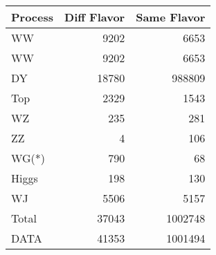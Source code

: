 \begin{table}[ht]
	\centering
\begin{tabular}{lrr}

Process &  Diff Flavor &  Same Flavor \\
		\hline
     WW &         9202 &         6653 \\
     WW &         9202 &         6653 \\
     DY &        18780 &       988809 \\
    Top &         2329 &         1543 \\
     WZ &          235 &          281 \\
     ZZ &            4 &          106 \\
  WG(*) &          790 &           68 \\
  Higgs &          198 &          130 \\
     WJ &         5506 &         5157 \\
\hline
  Total &        37043 &      1002748 \\
   DATA &        41353 &      1001494 \\


\end{tabular}

\end{table}